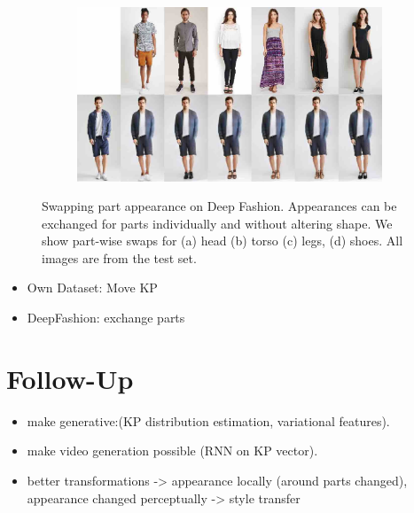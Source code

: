 \begin{figure}[ht]
\begin{subfigure}{0.49\linewidth}
		\label{fig:part3_21}
		\end{subfigure}
		\begin{subfigure}{0.49\linewidth}
		\centering
		\includegraphics[trim={0cm 0cm 0cm 0cm},clip, width=1.\linewidth]{fig/factor/part6_30}\caption{}
		\label{fig:part3_30}
		\end{subfigure}
		\caption{Swapping part appearance on Deep Fashion. Appearances can be exchanged for parts individually and without altering shape. We show part-wise swaps for (a) head (b) torso (c) legs, (d) shoes. All images are from the test set.}
		\label{fig:partswaps}
	\end{figure}
	\begin{itemize}
		\item Own Dataset: Move KP
		\item DeepFashion: exchange parts
	\end{itemize}
%
\section{Follow-Up}
	\begin{itemize}
		\item make generative:(KP distribution estimation, variational features).
		\item make video generation possible (RNN on KP vector).
		\item better transformations -> appearance locally (around parts changed), appearance changed perceptually -> style transfer
	\end{itemize}


